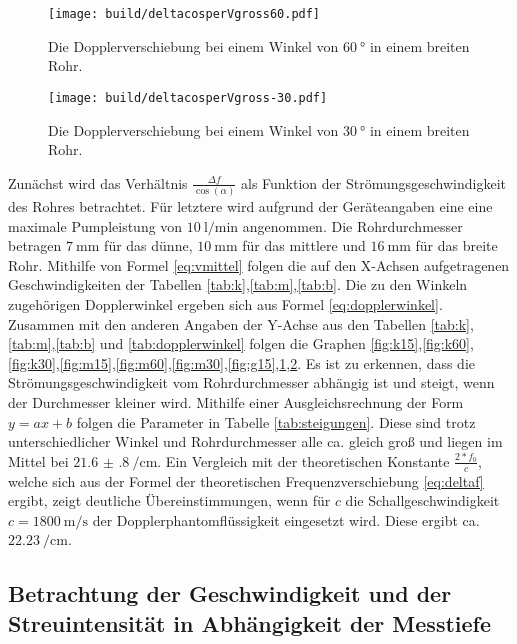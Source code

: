 \begin{figure}
 \centering
 \caption{Die Dopplerverschiebung bei einem Winkel von $\SI{60}{\degree}$ in einem breiten Rohr.}
 \texttt{[image: build/deltacosperVgross60.pdf]}
 \label{fig:g60}
\end{figure}

\begin{figure}
 \centering
 \caption{Die Dopplerverschiebung bei einem Winkel von $\SI{30}{\degree}$ in einem breiten Rohr.}
 \texttt{[image: build/deltacosperVgross-30.pdf]}
 \label{fig:g30}
\end{figure}

Zunächst wird das Verhältnis $\frac{\Delta f}{\cos(\alpha)}$ als Funktion der
Strömungsgeschwindigkeit des Rohres betrachtet. Für letztere wird aufgrund der Geräteangaben eine eine maximale
Pumpleistung von $\SI{10}{\litre\per\minute}$ angenommen. Die Rohrdurchmesser betragen
$\SI{7}{\milli\meter}$ für das dünne, $\SI{10}{\milli\meter}$ für das mittlere und
$\SI{16}{\milli\meter}$ für das breite Rohr. Mithilfe von
Formel \ref{eq:vmittel} folgen die auf den X-Achsen aufgetragenen Geschwindigkeiten der Tabellen \ref{tab:k},\ref{tab:m},\ref{tab:b}.
Die zu den Winkeln zugehörigen Dopplerwinkel ergeben sich aus Formel \ref{eq:dopplerwinkel}.
Zusammen mit den anderen Angaben der Y-Achse aus den Tabellen \ref{tab:k},\ref{tab:m},\ref{tab:b} und \ref{tab:dopplerwinkel} folgen die Graphen
\ref{fig:k15},\ref{fig:k60},\ref{fig:k30},\ref{fig:m15},\ref{fig:m60},\ref{fig:m30},\ref{fig:g15},\ref{fig:g60},\ref{fig:g30}.
Es ist zu erkennen, dass die Strömungsgeschwindigkeit vom Rohrdurchmesser abhängig
ist und steigt, wenn der Durchmesser kleiner wird. Mithilfe einer Ausgleichsrechnung
der Form $y=ax+b$ folgen die Parameter in Tabelle \ref{tab:steigungen}. Diese
sind trotz unterschiedlicher Winkel und Rohrdurchmesser alle ca. gleich groß und
liegen im Mittel bei $\SI{21.6(8)}{\per\centi\meter}$. Ein Vergleich mit der theoretischen
Konstante $\frac{2*f_0}{c}$, welche sich aus der Formel der theoretischen
Frequenzverschiebung \ref{eq:deltaf} ergibt, zeigt deutliche Übereinstimmungen, wenn für $c$
die Schallgeschwindigkeit $c = \SI{1800}{\meter\per\second}$ der Dopplerphantomflüssigkeit
eingesetzt wird. Diese ergibt ca. $\SI{22.23}{\per\centi\meter}$.



\subsection{Betrachtung der Geschwindigkeit und der Streuintensität in Abhängigkeit der Messtiefe}

